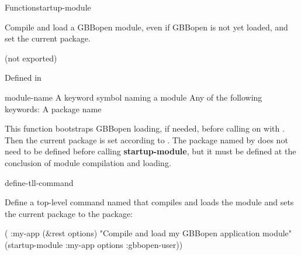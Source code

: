 \documentclass[10pt,twoside,english,pdftex]{article}
\begin{document}

\begin{functiondoc}{Function}{startup-module}%
  {}
%
% 
%
%
%
%
%

\fnsyntax 

\fnpurpose Compile and load a GBBopen module, even if GBBopen is not
yet loaded, and set the current package.

\fnpackage {} (not exported)

\fnmodule Defined in 

\fnargs
\begin{args}{module-name}
 A keyword symbol naming a module 
\arg[option] Any of the following keywords: 
\compilemoduleoptions
{} A package name
\end{args}

\fndescription This function bootstraps GBBopen loading, if needed, before
calling \textbf{} on  with
.  Then the current package is set according to
.  The package named by  does not need
to be defined before calling \textbf{startup-module}, but it must be defined
at the conclusion of module compilation and loading.

\begin{alsos}{define-tll-command}
\end{alsos}

\fnexample
Define a top-level command named  that compiles
and loads the module  and sets the current package
to the  package:
\begin{example}
  ( :my-app (&rest options)
    "Compile and load my GBBopen application module"
    (startup-module :my-app options :gbbopen-user))
\end{example} 

\end{functiondoc}

\end{document}
